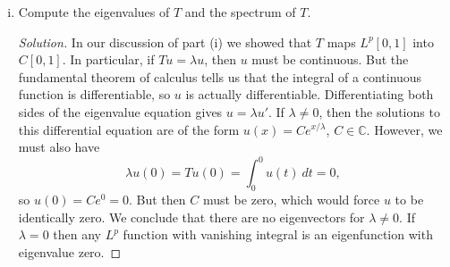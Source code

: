 \documentclass[11pt,letterpaper]{report}
\newcommand{\complex}{\mathbb{C}}
\newenvironment{solution}
{\begin{proof}[Solution]}
{\end{proof}}
\begin{document}
\begin{enumerate}[(i)]
	\item Compute the eigenvalues of $T$ and the spectrum of $T$.
	\begin{solution}
		In our discussion of part (i) we showed that $T$ maps $L^p[0,1]$ into $C[0,1]$. In particular, if $Tu = \lambda u$, then $u$ must be continuous. But the fundamental theorem of calculus tells us that the integral of a continuous function is differentiable, so $u$ is actually differentiable. Differentiating both sides of the eigenvalue equation gives $u = \lambda u'$. If $\lambda \neq 0$, then the solutions to this differential equation are of the form $u(x) = Ce^{x/\lambda}$, $C\in \complex$. However, we must also have
		\[
		\lambda u(0) = Tu(0) = \int_0^0u(t)\ dt = 0,
		\]
		so $u(0) = Ce^0 = 0$. But then $C$ must be zero, which would force $u$ to be identically zero. We conclude that there are no eigenvectors for $\lambda \neq 0$. If $\lambda = 0$ then any $L^p$ function with vanishing integral is an eigenfunction with eigenvalue zero.
	\end{solution}
\end{enumerate}
\end{document}

